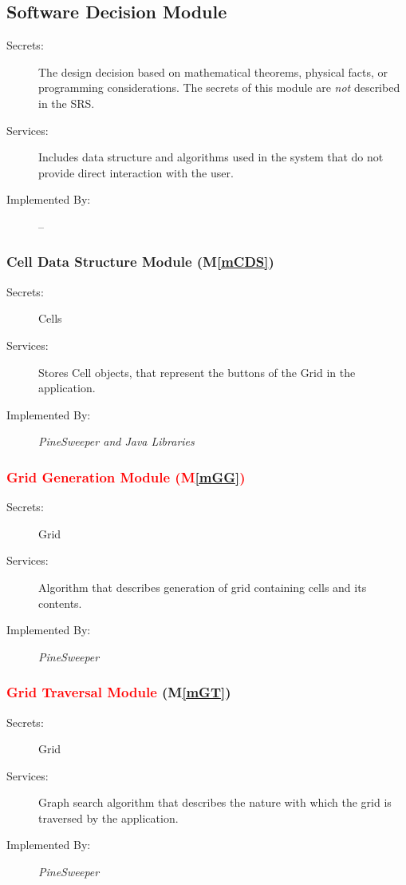 \documentclass[12pt, titlepage]{article}
\newcommand{\mref}[1]{M\ref{#1}}
\begin{document}
\newpage
\subsection{Software Decision Module}
\begin{description}
\item[Secrets:] The design decision based on mathematical theorems, physical
  facts, or programming considerations. The secrets of this module are
  \emph{not} described in the SRS.
\item[Services:] Includes data structure and algorithms used in the system that
  do not provide direct interaction with the user. 
\item[Implemented By:] -- \\
\end{description}

\subsubsection{Cell Data Structure Module (\mref{mCDS})}
\begin{description}
\item[Secrets:] Cells
\item[Services:] Stores Cell objects, that represent the buttons of the
   Grid in the application.
\item[Implemented By:] \textit{PineSweeper and Java Libraries}\\
\end{description}

\subsubsection{\textcolor{red}{Grid Generation Module (\mref{mGG})}}
\begin{description}
\item[Secrets:] Grid
\item[Services:] Algorithm that describes generation of grid 
   containing cells and its contents.
\item[Implemented By:] \textit{PineSweeper}\\
\end{description}

\subsubsection{\textcolor{red}{Grid Traversal Module} (\mref{mGT})}
\begin{description}
\item[Secrets:] Grid
\item[Services:] Graph search algorithm that describes the 
   nature with which the grid is traversed by the application.
\item[Implemented By:] \textit{PineSweeper}\\
\end{description}
\end{document}
